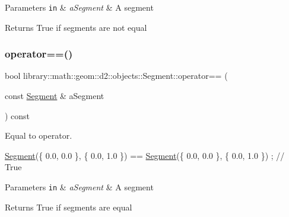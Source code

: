 \begin{DoxyParams}[1]{Parameters}
\mbox{\tt in}  & {\em a\+Segment} & A segment \\
\hline
\end{DoxyParams}
\begin{DoxyReturn}{Returns}
True if segments are not equal 
\end{DoxyReturn}
\mbox{\label{classlibrary_1_1math_1_1geom_1_1d2_1_1objects_1_1_segment_a639981918aaa52807452451b19dbf680}} 
\subsubsection{\texorpdfstring{operator==()}{operator==()}}
{\footnotesize\ttfamily bool library\+::math\+::geom\+::d2\+::objects\+::\+Segment\+::operator== (\begin{DoxyParamCaption}\item[{const \hyperlink{classlibrary_1_1math_1_1geom_1_1d2_1_1objects_1_1_segment}{Segment} \&}]{a\+Segment }\end{DoxyParamCaption}) const}



Equal to operator. 


\begin{DoxyCode}
\hyperlink{classlibrary_1_1math_1_1geom_1_1d2_1_1objects_1_1_segment_a44ba44fd5f02a02fe34c40223b38fa8f}{Segment}(\{ 0.0, 0.0 \}, \{ 0.0, 1.0 \}) == \hyperlink{classlibrary_1_1math_1_1geom_1_1d2_1_1objects_1_1_segment_a44ba44fd5f02a02fe34c40223b38fa8f}{Segment}(\{ 0.0, 0.0 \}, \{ 0.0, 1.0 \}) ; \textcolor{comment}{// True}
\end{DoxyCode}



\begin{DoxyParams}[1]{Parameters}
\mbox{\tt in}  & {\em a\+Segment} & A segment \\
\hline
\end{DoxyParams}
\begin{DoxyReturn}{Returns}
True if segments are equal 
\end{DoxyReturn}
\mbox{\label{classlibrary_1_1math_1_1geom_1_1d2_1_1objects_1_1_segment_abfe0b4983dcb9e26848d29a9b86d4b9c}} 
